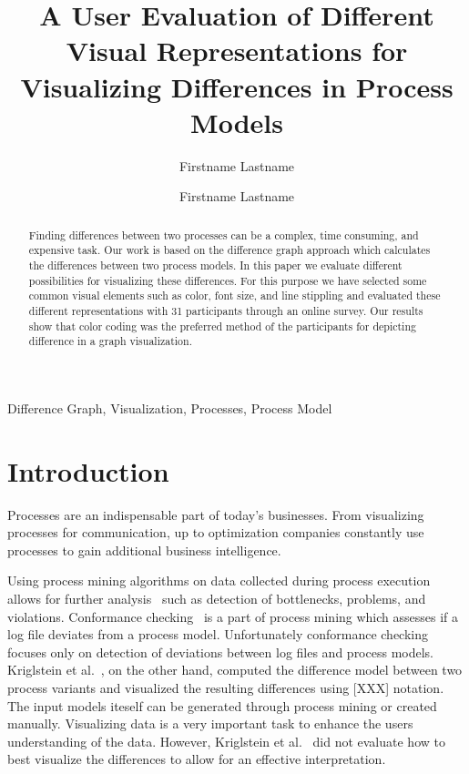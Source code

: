 \documentclass{llncs}
\begin{document}
\title{A User Evaluation of Different Visual Representations for Visualizing Differences in Process Models}

\author{Firstname Lastname \and Firstname Lastname}
\maketitle

\begin{abstract}
Finding differences between two processes can be a complex, time consuming, and expensive task. Our work is based on the difference graph approach which calculates the differences between two process models. In this paper we evaluate different possibilities for visualizing these differences. For this purpose we have selected some common visual elements such as color, font size, and line stippling and evaluated these different representations with 31 participants through an online survey. Our results show that color coding was the preferred method of the participants for depicting difference in a graph visualization.
\end{abstract}

\begin{keywords}
	Difference Graph, Visualization, Processes, Process Model
\end{keywords}

\section{Introduction}
\label{sec:Introduction} %

Processes are an indispensable part of today's businesses. From visualizing processes for communication, up to optimization companies constantly use processes to gain additional business intelligence.

Using process mining algorithms on data collected during process execution allows for further analysis~\cite{lit:PMDiscoveryConformanceEnhancement} such as detection of bottlenecks, problems, and violations. Conformance checking~\cite{lit:ConformanceCheckingOfProcesses} is a part of process mining which assesses if a log file deviates from a process model. Unfortunately conformance checking focuses only on detection of deviations between log files and process models. Kriglstein et al.~\cite{lit:VisuApprDiffAnalysis}, on the other hand, computed the difference model between two process variants and visualized the resulting differences using [XXX] notation. The input models iteself can be generated through process mining or created manually. Visualizing data is a very important task to enhance the users understanding of the data. However, Kriglstein et al.~\cite{lit:VisuApprDiffAnalysis} did not evaluate how to best visualize the differences to allow for an effective interpretation.
\end{document}
